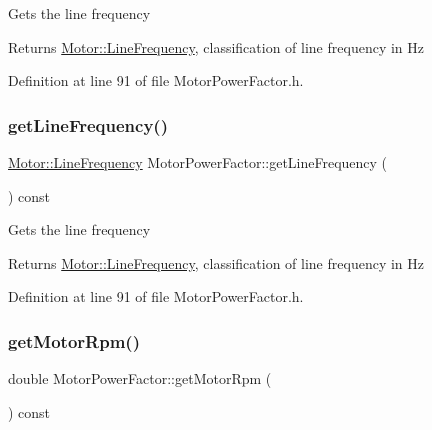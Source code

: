 Gets the line frequency

\begin{DoxyReturn}{Returns}
\hyperlink{class_motor_acee1bdf1b684ad36cb80dc2829d9fcee}{Motor\+::\+Line\+Frequency}, classification of line frequency in Hz 
\end{DoxyReturn}


Definition at line 91 of file Motor\+Power\+Factor.\+h.

\mbox{\label{class_motor_power_factor_aa4cdc420b1f611bcb9f4a69c69c1fabf}} 
\subsubsection{\texorpdfstring{get\+Line\+Frequency()}{getLineFrequency()}\hspace{0.1cm}{\footnotesize\ttfamily [3/3]}}
{\footnotesize\ttfamily \hyperlink{class_motor_acee1bdf1b684ad36cb80dc2829d9fcee}{Motor\+::\+Line\+Frequency} Motor\+Power\+Factor\+::get\+Line\+Frequency (\begin{DoxyParamCaption}{ }\end{DoxyParamCaption}) const\hspace{0.3cm}{\ttfamily [inline]}}

Gets the line frequency

\begin{DoxyReturn}{Returns}
\hyperlink{class_motor_acee1bdf1b684ad36cb80dc2829d9fcee}{Motor\+::\+Line\+Frequency}, classification of line frequency in Hz 
\end{DoxyReturn}


Definition at line 91 of file Motor\+Power\+Factor.\+h.

\mbox{\label{class_motor_power_factor_acc7e144fc6c05446141cb0e07be03d70}} 
\subsubsection{\texorpdfstring{get\+Motor\+Rpm()}{getMotorRpm()}\hspace{0.1cm}{\footnotesize\ttfamily [1/3]}}
{\footnotesize\ttfamily double Motor\+Power\+Factor\+::get\+Motor\+Rpm (\begin{DoxyParamCaption}{ }\end{DoxyParamCaption}) const\hspace{0.3cm}{\ttfamily [inline]}}

